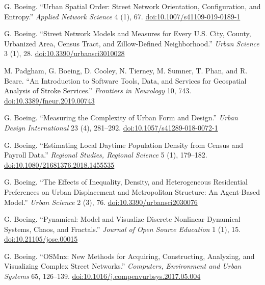 \begin{tablist}
        \item[2019] \tab{}G. Boeing. \enquote{Urban Spatial Order: Street Network Orientation, Configuration, and Entropy.} \textit{Applied Network Science} 4 (1), 67. \href{https://doi.org/10.1007/s41109-019-0189-1}{doi:10.1007/s41109-019-0189-1}

        \item[2019] \tab{}G. Boeing. \enquote{Street Network Models and Measures for Every U.S. City, County, Urbanized Area, Census Tract, and Zillow-Defined Neighborhood.} \textit{Urban Science} 3 (1), 28. \href{https://doi.org/10.3390/urbansci3010028}{doi:10.3390/urbansci3010028}

        \item[2019] \tab{}M. Padgham, G. Boeing, D. Cooley, N. Tierney, M. Sumner, T. Phan, and R. Beare. \enquote{An Introduction to Software Tools, Data, and Services for Geospatial Analysis of Stroke Services.} \textit{Frontiers in Neurology} 10, 743. \href{https://doi.org/10.3389/fneur.2019.00743}{doi:10.3389/fneur.2019.00743}

        \item[2018] \tab{}G. Boeing. \enquote{Measuring the Complexity of Urban Form and Design.} \textit{Urban Design International} 23 (4), 281--292. \href{https://doi.org/10.1057/s41289-018-0072-1}{doi:10.1057/s41289-018-0072-1}

        \item[2018] \tab{}G. Boeing. \enquote{Estimating Local Daytime Population Density from Census and Payroll Data.} \textit{Regional Studies, Regional Science} 5 (1), 179--182. \href{https://doi.org/10.1080/21681376.2018.1455535}{doi:10.1080/21681376.2018.1455535}

        \item[2018] \tab{}G. Boeing. \enquote{The Effects of Inequality, Density, and Heterogeneous Residential Preferences on Urban Displacement and Metropolitan Structure: An Agent-Based Model.} \textit{Urban Science} 2 (3), 76. \href{https://doi.org/10.3390/urbansci2030076}{doi:10.3390/urbansci2030076}

        \item[2018] \tab{}G. Boeing. \enquote{Pynamical: Model and Visualize Discrete Nonlinear Dynamical Systems, Chaos, and Fractals.} \textit{Journal of Open Source Education} 1 (1), 15. \href{https://doi.org/10.21105/jose.00015}{doi:10.21105/jose.00015}

        \item[2017] \tab{}G. Boeing. \enquote{OSMnx: New Methods for Acquiring, Constructing, Analyzing, and Visualizing Complex Street Networks.} \textit{Computers, Environment and Urban Systems} 65, 126--139. \href{https://doi.org/10.1016/j.compenvurbsys.2017.05.004}{doi:10.1016/j.compenvurbsys.2017.05.004}


\end{tablist}
